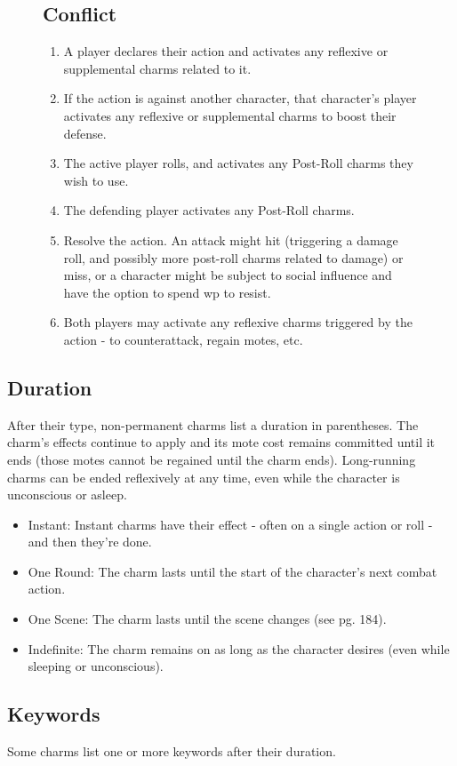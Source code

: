\documentclass[oneside]{book}
\newlength{\sidewidth}
\newenvironment{sidebarPartial}[2][]{%
   \def\imgcmd{\texttt{[image: \#2]}}%
   \begin{lrbox}{\mysavebox}%
   \begin{minipage}%
}{%
   \end{minipage}
   \end{lrbox}%
   \sbox\mysavebox{\fbox{\usebox\mysavebox}}%
   \mbox{\rlap{\raisebox{-\dp\mysavebox}{\imgcmd}}\usebox\mysavebox}%
}
\newenvironment{sidebar}[1]{%
  \begin{figure*}[tb]%
  \begin{sidebarPartial}{resources/bg-sidebar.jpg}{\textwidth}%
  \vspace{6pt}
  \subsection*{#1}\vspace{6pt}%
  \centering
  \begin{minipage}{\sidewidth}
}
{
  \end{minipage}
  \vspace{6pt}
  \end{sidebarPartial}
  \end{figure*}
}
\begin{document}
\begin{multicols}{2}
\begin{sidebar}{Conflict}
  \begin{enumerate}
    \item A player declares their action and activates any reflexive or supplemental charms related to it.
    \item If the action is against another character, that character's player activates any reflexive or supplemental charms to boost their defense.
    \item The active player rolls, and activates any Post-Roll charms they wish to use.
    \item The defending player activates any Post-Roll charms.
    \item Resolve the action. An attack might hit (triggering a damage roll, and possibly more post-roll charms related to damage) or miss, or a character might be subject to social influence and have the option to spend wp to resist.
    \item Both players may activate any reflexive charms triggered by the action - to counterattack, regain motes, etc.
  \end{enumerate}
\end{sidebar}

\subsection*{Duration}
\par After their type, non-permanent charms list a duration in parentheses. The charm's effects continue to apply and its mote cost remains committed until it ends (those motes cannot be regained until the charm ends). Long-running charms can be ended reflexively at any time, even while the character is unconscious or asleep.

\begin{itemize}
  \item Instant: Instant charms have their effect - often on a single action or roll - and then they're done.
  \item One Round: The charm lasts until the start of the character's next combat action.
  \item One Scene: The charm lasts until the scene changes (see pg. 184).
  \item Indefinite: The charm remains on as long as the character desires (even while sleeping or unconscious).
\end{itemize}

\subsection*{Keywords}
\par Some charms list one or more keywords after their duration.


\end{multicols}
\end{document}
